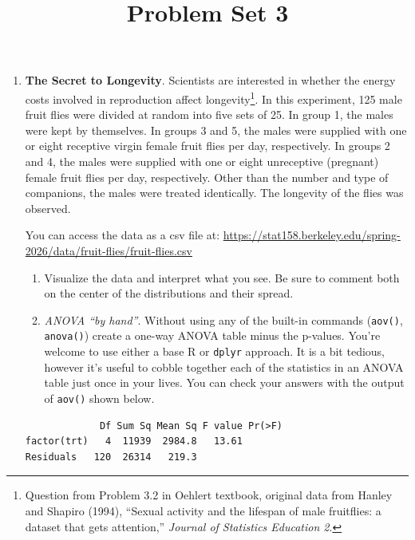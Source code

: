 \documentclass[
  letterpaper,
  DIV=11,
  numbers=noendperiod]{scrartcl}
\title{Problem Set 3}
\author{}
\date{}
\begin{document}
\maketitle


\begin{enumerate}
\def\labelenumi{\arabic{enumi}.}
\item
  \textbf{The Secret to Longevity}. Scientists are interested in whether
  the energy costs involved in reproduction affect longevity\footnote{Question
    from Problem 3.2 in Oehlert textbook, original data from Hanley and
    Shapiro (1994), ``Sexual activity and the lifespan of male
    fruitflies: a dataset that gets attention,'' \emph{Journal of
    Statistics Education 2}.}. In this experiment, 125 male fruit flies
  were divided at random into five sets of 25. In group 1, the males
  were kept by themselves. In groups 3 and 5, the males were supplied
  with one or eight receptive virgin female fruit flies per day,
  respectively. In groups 2 and 4, the males were supplied with one or
  eight unreceptive (pregnant) female fruit flies per day, respectively.
  Other than the number and type of companions, the males were treated
  identically. The longevity of the flies was observed.

  You can access the data as a csv file at:
  \url{https://stat158.berkeley.edu/spring-2026/data/fruit-flies/fruit-flies.csv}

  \begin{enumerate}
  \def\labelenumii{\alph{enumii}.}
  \item
    Visualize the data and interpret what you see. Be sure to comment
    both on the center of the distributions and their spread.
  \item
    \emph{ANOVA ``by hand''}. Without using any of the built-in commands
    (\texttt{aov()}, \texttt{anova()}) create a one-way ANOVA table
    minus the p-values. You're welcome to use either a base R or
    \texttt{dplyr} approach. It is a bit tedious, however it's useful to
    cobble together each of the statistics in an ANOVA table just once
    in your lives. You can check your answers with the output of
    \texttt{aov()} shown below.
  \end{enumerate}

\begin{verbatim}
             Df Sum Sq Mean Sq F value Pr(>F)
factor(trt)   4  11939  2984.8   13.61       
Residuals   120  26314   219.3               
\end{verbatim}


\end{enumerate}
\end{document}
